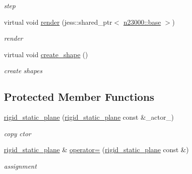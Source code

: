 \begin{DoxyCompactItemize}
\begin{DoxyCompactList}\small\item\em step \item\end{DoxyCompactList}\item 
virtual void \hyperlink{classnebula_1_1content_1_1actor_1_1physics_1_1rigid__static__plane_af65fe2333f202fcf0dc9b95f00793c88}{render} (jess::shared\_\-ptr$<$ \hyperlink{classnebula_1_1platform_1_1renderer_1_1base}{n23000::base} $>$)
\begin{DoxyCompactList}\small\item\em render \item\end{DoxyCompactList}\item 
virtual void \hyperlink{classnebula_1_1content_1_1actor_1_1physics_1_1rigid__static__plane_ae711cbc9bd080a597efd1a5193756152}{create\_\-shape} ()
\begin{DoxyCompactList}\small\item\em create shapes \item\end{DoxyCompactList}\end{DoxyCompactItemize}
\subsection*{Protected Member Functions}
\begin{DoxyCompactItemize}
\item 
\hyperlink{classnebula_1_1content_1_1actor_1_1physics_1_1rigid__static__plane_a1d27dcdd2e2648e8296620dbdd05388e}{rigid\_\-static\_\-plane} (\hyperlink{classnebula_1_1content_1_1actor_1_1physics_1_1rigid__static__plane}{rigid\_\-static\_\-plane} const \&\_\-actor\_\-)
\begin{DoxyCompactList}\small\item\em copy ctor \item\end{DoxyCompactList}\item 
\hyperlink{classnebula_1_1content_1_1actor_1_1physics_1_1rigid__static__plane}{rigid\_\-static\_\-plane} \& \hyperlink{classnebula_1_1content_1_1actor_1_1physics_1_1rigid__static__plane_a507d6d75754916f23d673205d53b3874}{operator=} (\hyperlink{classnebula_1_1content_1_1actor_1_1physics_1_1rigid__static__plane}{rigid\_\-static\_\-plane} const \&)
\begin{DoxyCompactList}\small\item\em assignment \item\end{DoxyCompactList}\end{DoxyCompactItemize}


